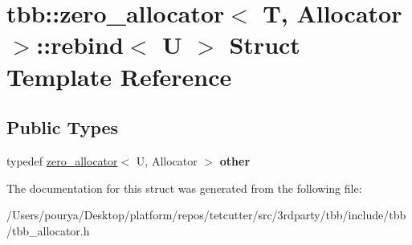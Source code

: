 \hypertarget{structtbb_1_1zero__allocator_1_1rebind}{}\section{tbb\+:\+:zero\+\_\+allocator$<$ T, Allocator $>$\+:\+:rebind$<$ U $>$ Struct Template Reference}
\label{structtbb_1_1zero__allocator_1_1rebind}
\subsection*{Public Types}
\begin{DoxyCompactItemize}
\item 
\hypertarget{structtbb_1_1zero__allocator_1_1rebind_aab450b73dbeb738f88700ac54ce04ce9}{}typedef \hyperlink{classtbb_1_1zero__allocator}{zero\+\_\+allocator}$<$ U, Allocator $>$ {\bfseries other}\label{structtbb_1_1zero__allocator_1_1rebind_aab450b73dbeb738f88700ac54ce04ce9}

\end{DoxyCompactItemize}


The documentation for this struct was generated from the following file\+:\begin{DoxyCompactItemize}
\item 
/\+Users/pourya/\+Desktop/platform/repos/tetcutter/src/3rdparty/tbb/include/tbb/tbb\+\_\+allocator.\+h\end{DoxyCompactItemize}
